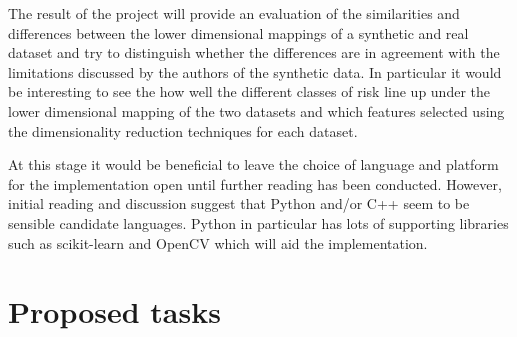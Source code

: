 \documentclass[11pt,fleqn,twoside]{article}
\begin{document}
The result of the project will provide an evaluation of the similarities and differences between the lower dimensional mappings of a synthetic and real dataset and try to distinguish whether the differences are in agreement with the limitations discussed by the authors of the synthetic data. In particular it would be interesting to see the how well the different classes of risk line up under the lower dimensional mapping of the two datasets and which features selected using the dimensionality reduction techniques for each dataset.

At this stage it would be beneficial to leave the choice of language and platform for the implementation open until further reading has been conducted. However, initial reading and discussion suggest that Python and/or C++ seem to be sensible candidate languages. Python in particular has lots of supporting libraries such as scikit-learn \cite{scikit-learn-site} and OpenCV \cite{opencv-site} which will aid the implementation.

\section{Proposed tasks}
\end{document}
